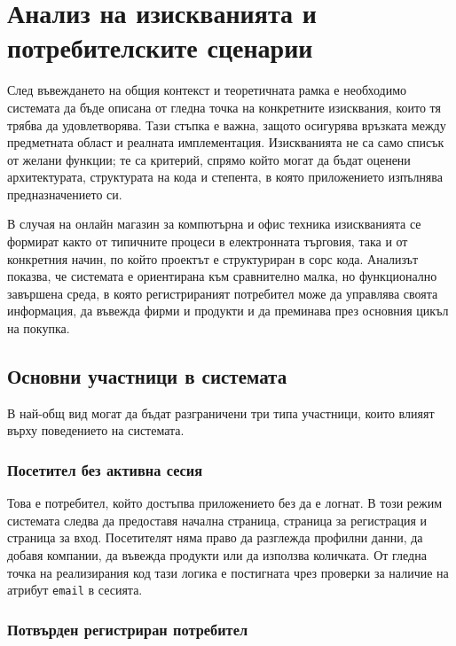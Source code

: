 \section{Анализ на изискванията и потребителските сценарии}

След въвеждането на общия контекст и теоретичната рамка е необходимо системата да бъде описана от гледна точка на конкретните изисквания, които тя трябва да удовлетворява. Тази стъпка е важна, защото осигурява връзката между предметната област и реалната имплементация. Изискванията не са само списък от желани функции; те са критерий, спрямо който могат да бъдат оценени архитектурата, структурата на кода и степента, в която приложението изпълнява предназначението си.

В случая на онлайн магазин за компютърна и офис техника изискванията се формират както от типичните процеси в електронната търговия, така и от конкретния начин, по който проектът е структуриран в сорс кода. Анализът показва, че системата е ориентирана към сравнително малка, но функционално завършена среда, в която регистрираният потребител може да управлява своята информация, да въвежда фирми и продукти и да преминава през основния цикъл на покупка.

\subsection{Основни участници в системата}

В най-общ вид могат да бъдат разграничени три типа участници, които влияят върху поведението на системата.

\subsubsection{Посетител без активна сесия}

Това е потребител, който достъпва приложението без да е логнат. В този режим системата следва да предоставя начална страница, страница за регистрация и страница за вход. Посетителят няма право да разглежда профилни данни, да добавя компании, да въвежда продукти или да използва количката. От гледна точка на реализирания код тази логика е постигната чрез проверки за наличие на атрибут \texttt{email} в сесията.

\subsubsection{Потвърден регистриран потребител}

